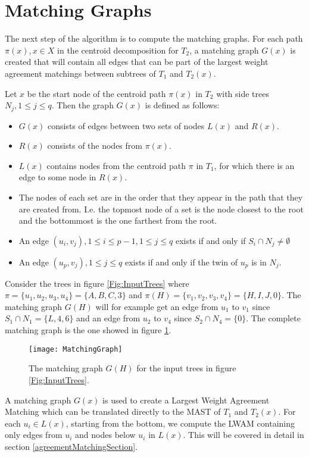 \section{Matching Graphs}
The next step of the algorithm is to compute the matching graphs. For each path $\pi(x), x \in X$ in the centroid decomposition for $T_2$, a matching graph $G(x)$ is created that will contain all edges that can be part of the largest weight agreement matchings between subtrees of $T_1$ and $T_2(x)$.

Let $x$ be the start node of the centroid path $\pi(x)$ in $T_2$ with side trees $N_j, 1 \le j \le q$. Then the graph $G(x)$ is defined as follows:

\begin{itemize}
	\item $G(x)$ consists of edges between two sets of nodes $L(x)$ and $R(x)$.
	\item $R(x)$ consists of the nodes from $\pi(x)$.
	\item $L(x)$ contains nodes from the centroid path $\pi$ in $T_1$, for which there is an edge to some node in $R(x)$.
	\item The nodes of each set are in the order that they appear in the path that they are created from. I.e. the topmost node of a set is the node closest to the root and the bottommost is the one farthest from the root.
	\item An edge $(u_i, v_j), 1 \le i \le p-1, 1 \le j \le q$ exists if and only if $S_i \cap N_j \ne \emptyset$
	\item An edge $(u_p, v_j), 1 \le j \le q$ exists if and only if the twin of $u_p$ is in $N_j$.
\end{itemize}

Consider the trees in figure \ref{Fig:InputTrees} where $\pi = \{u_1,u_2,u_3,u_4\} = \{A,B,C,3\}$ and $\pi(H) = \{v_1,v_2,v_3,v_4\} = \{H,I,J,0\}$. The matching graph $G(H)$ will for example get an edge from $u_1$ to $v_1$ since $S_1 \cap N_1 = \{L,4,6\}$ and an edge from $u_2$ to $v_4$ since $S_2 \cap N_4 = \{0\}$. The complete matching graph is the one showed in figure \ref{matchingGraphFigure}.

\begin{figure}
	\texttt{[image: MatchingGraph]}
	\caption{The matching graph $G(H)$ for the input trees in figure \ref{Fig:InputTrees}.}
	\label{matchingGraphFigure}
\end{figure}

A matching graph $G(x)$ is used to create a Largest Weight Agreement Matching which can be translated directly to the MAST of $T_1$ and $T_2(x)$. For each $u_i \in L(x)$, starting from the bottom, we compute the LWAM containing only edges from $u_i$ and nodes below $u_i$ in $L(x)$. This will be covered in detail in section \ref{agreementMatchingSection}.

